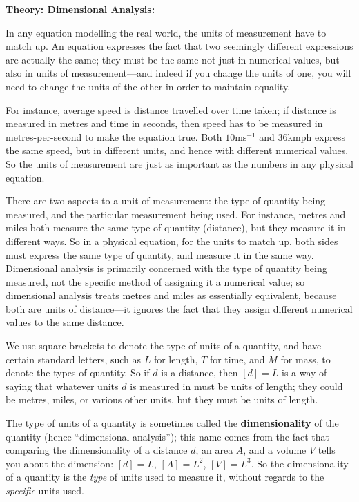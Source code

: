 \documentclass{article}
\begin{document}
\textbf{Theory: Dimensional Analysis:}\bigskip


In any equation modelling the real world, the units of measurement have to match up. An equation expresses the fact that two seemingly different expressions are actually the same; they must be the same not just in numerical values, but also in units of measurement---and indeed if you change the units of one, you will need to change the units of the other in order to maintain equality.

For instance, average speed is distance travelled over time taken; if distance is measured in metres and time in seconds, then speed has to be measured in metres-per-second to make the equation true. Both $10\mathrm{ms}^{-1}$ and $36\mathrm{kmph}$ express the same speed, but in different units, and hence with different numerical values. So the units of measurement are just as important as the numbers in any physical equation.

There are two aspects to a unit of measurement: the type of quantity being measured, and the particular measurement being used. For instance, metres and miles both measure the same type of quantity (distance), but they measure it in different ways. So in a physical equation, for the units to match up, both sides must express the same type of quantity, and measure it in the same way. Dimensional analysis is primarily concerned with the type of quantity being measured, not the specific method of assigning it a numerical value; so dimensional analysis treats metres and miles as essentially equivalent, because both are units of distance---it ignores the fact that they assign different numerical values to the same distance.

We use square brackets to denote the type of units of a quantity, and have certain standard letters, such as $L$ for length, $T$ for time, and $M$ for mass, to denote the types of quantity. So if $d$ is a distance, then $[d]=L$ is a way of saying that whatever units $d$ is measured in must be units of length; they could be metres, miles, or various other units, but they must be units of length.

The type of units of a quantity is sometimes called the \textbf{dimensionality} of the quantity (hence ``dimensional analysis''); this name comes from the fact that comparing the dimensionality of a distance $d$, an area $A$, and a volume $V$ tells you about the dimension: $[d]=L$, $[A]=L^2$, $[V]=L^3$. So the dimensionality of a quantity is the \textit{type} of units used to measure it, without regards to the \textit{specific} units used.
\end{document}
